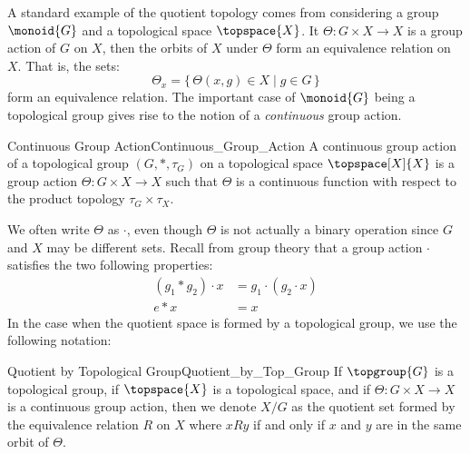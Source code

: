 \documentclass{article}                                                        %
\begin{document}
        A standard example of the quotient topology comes from considering
        a group $\monoid{G}$ and a topological space $\topspace{X}$. It
        $\Theta:G\times{X}\rightarrow{X}$ is a group action of $G$ on $X$, then
        the orbits of $X$ under $\Theta$ form an equivalence relation on $X$.
        That is, the sets:
        \begin{equation}
            \Theta_{x}=\{\,\Theta(x,g)\in{X}\;|\;g\in{G}\,\}
        \end{equation}
        form an equivalence relation. The important case of $\monoid{G}$ being a
        topological group gives rise to the notion of a \textit{continuous}
        group action.
        \begin{fdefinition}{Continuous Group Action}{Continuous_Group_Action}
            A continuous group action of a topological group $(G,*,\tau_{G})$ on
            a topological space $\topspace[X]{X}$ is a group action
            $\Theta:G\times{X}\rightarrow{X}$ such that $\Theta$ is
            a continuous function with respect to the product topology
            $\tau_{G}\times\tau_{X}$.
        \end{fdefinition}
        We often write $\Theta$ as $\cdot$, even though $\Theta$ is not actually
        a binary operation since $G$ and $X$ may be different sets. Recall from
        group theory that a group action $\cdot$ satisfies the two following
        properties:
        \begin{align}
            (g_{1}*{g}_{2})\cdot{x}&=g_{1}\cdot(g_{2}\cdot{x})\\
            e*x&=x
        \end{align}
        In the case when the quotient space is formed by a topological group, we
        use the following notation:
        \begin{fnotation}{Quotient by Topological Group}{Quotient_by_Top_Group}
            If $\topgroup{G}$ is a topological group, if $\topspace{X}$ is a
            topological space, and if $\Theta:G\times{X}\rightarrow{X}$ is a
            continuous group action, then we denote $X/G$ as the quotient set
            formed by the equivalence relation $R$ on $X$ where $xRy$ if and
            only if $x$ and $y$ are in the same orbit of $\Theta$.
        \end{fnotation}
\end{document}
